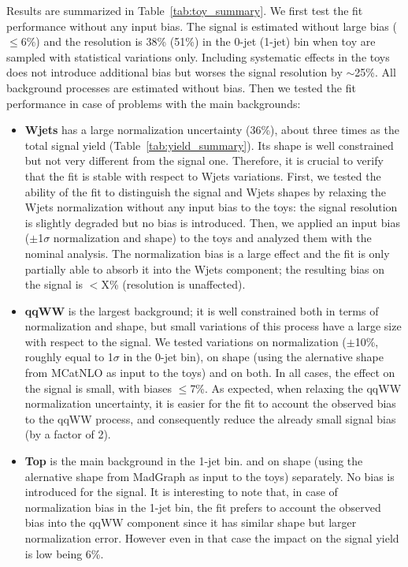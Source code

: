 Results are summarized in Table~\ref{tab:toy_summary}.
We first test the fit performance without any input bias. 
The signal is estimated without large bias ($\leq 6$\%) and the resolution is 38\% (51\%) in the 0-jet (1-jet) bin 
when toy are sampled with statistical variations only. Including systematic effects in the toys does not introduce
additional bias but worses the signal resolution by $\sim$25\%. All background processes are estimated without bias.
Then we tested the fit performance in case of problems with the main backgrounds:
\begin{itemize}
\item {\bf Wjets} has a large normalization uncertainty (36\%), about three times as the total signal yield (Table~\ref{tab:yield_summary}). 
Its shape is well constrained but not very different from the signal one. 
Therefore, it is crucial to verify that the fit is stable with respect to Wjets variations.
First, we tested the ability of the fit to distinguish the signal and Wjets shapes by relaxing the Wjets normalization without any input bias to the toys: the signal resolution is slightly degraded but no bias is introduced. 
Then, we applied an input bias ($\pm$1$\sigma$ normalization and shape) to the toys and analyzed them with the nominal analysis. 
The normalization bias is a large effect and the fit is only partially able to absorb it into the Wjets component; 
the resulting bias on the signal is $<$X\% (resolution is unaffected).
\item {\bf qqWW} is the largest background; it is well constrained both in terms of normalization and shape, but small variations of this 
process have a large size with respect to the signal. 
We tested variations on normalization ($\pm$10\%, roughly equal to 1$\sigma$ in the 0-jet bin), 
on shape (using the alernative shape from MCatNLO as input to the toys) and on both. 
In all cases, the effect on the signal is small, with biases $\leq$7\%. 
As expected, when relaxing the qqWW normalization uncertainty, it is easier for the fit to account the observed bias to the qqWW process,
and consequently reduce the already small signal bias (by a factor of 2).
\item {\bf Top} is the main background in the 1-jet bin. 
and on shape 
(using the alernative shape from MadGraph as input to the toys) separately. No bias is introduced for the signal. 
It is interesting to note that, in case of normalization bias in the 1-jet bin, the fit prefers to account the observed bias 
into the qqWW component since it has similar shape but larger normalization error. However even in that case the impact 
on the signal yield is low being 6\%. 
\end{itemize}

